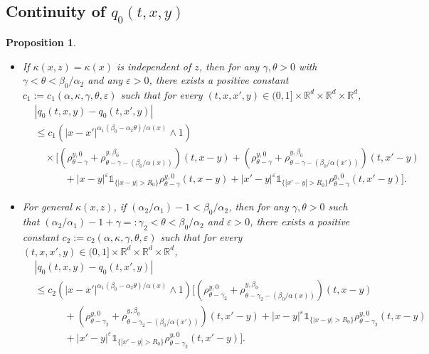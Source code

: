 \documentclass[a4paper,11pt]{amsart}
\renewcommand{\le}{\leqslant}
\newcommand{\R}{\mathds R}
\newcommand{\B}{\beta}
\newcommand{\I}{\mathds 1}
\newcommand{\K}{\kappa}
\newcommand{\A}{\alpha}
\newcommand{\G}{\gamma}
\newtheorem{proposition}[theorem]{Proposition}
\theoremstyle{definition}
\begin{document}
\subsection{Continuity of $q_0(t,x,y)$}
\begin{proposition}\label{p3-1-1a-p}
 \begin{itemize}
 \item[(1)] If $\kappa(x,z)=\K (x) $ is independent of $z$, then for any $\gamma,\theta>0$ with $\gamma<\theta<{\beta_0}/{\A_2}$ and any
$\varepsilon>0$,
there exists a positive constant $c_1:=c_1(\A,\K, \G, \theta,\varepsilon)$ such that
for every $(t,x,x',y)\in (0,1]\times \R^d\times \R^d \times \R^d$,
\begin{equation}\label{p3-1-1a-1}
\begin{split}
&|q_0(t,x,y)-q_0(t,x',y)|\\
&\le c_1\left(|x-x'|^{\A_1(\B_0-\A_2\theta)/{\A(x)}}\wedge 1\right)\\
&\quad \times\Big[\left(\rho^{y,0}_{\theta-\gamma}+\rho^{y,\B_0}_{\theta-\gamma-({\B_0}/{\A(x)})}\right)(t,x-y)
+\left(\rho^{y,0}_{\theta-\gamma}+\rho^{y,\B_0}_{\theta-\gamma-({\B_0}/{\A(x')})}\right)(t,x'-y)\\
&\qquad\quad  +|x-y|^{\varepsilon}\I_{\{|x-y|>R_0\}}\rho^{y,0}_{\theta-\gamma}(t,x-y) +|x'-y|^{\varepsilon}\I_{\{|x'-y|>R_0\}}\rho^{y,0}_{\theta-\gamma}(t,x'-y)\Big].
\end{split}
\end{equation}

\item[(2)]
For general $\K (x, z)$, if $({\A_2}/{\A_1})-1<{\B_0}/{\A_2}$,
then for any $\gamma,\theta>0$ such that $ ({\A_2}/{\A_1})-1+\gamma =:\G_2 <\theta<{\B_0}/{\A_2}$ and
$\varepsilon>0$, there exists a positive constant $c_2:=c_2(\A,\K,\G,\theta,\varepsilon)$ such that for every $(t,x,x',y)\in (0,1]\times \R^d\times \R^d \times \R^d$,
\begin{equation}\label{p3-1-2a-1}
\begin{split}
& |q_0(t,x,y)-q_0(t,x',y)|\\
&\le c_2\left(|x-x'|^{\A_1(\B_0-\A_2\theta)/{\A(x)}}\wedge 1\right)
\Big[\left(\rho^{y,0}_{\theta-\G_2 }+\rho^{y,\B_0}_{\theta-\G_2-({\B_0}/{\A(x)})}\right)(t,x-y)\\
&\qquad\quad +\left(\rho^{y,0}_{\theta-\G_2}+\rho^{y,\B_0}_{\theta-\G_2 -({\B_0}/{\A(x')})}\right)(t,x'-y)
 +|x-y|^{\varepsilon}\I_{\{|x-y|>R_0\}}\rho^{y,0}_{\theta-\G_2 }(t,x-y)\\
 & \qquad \quad
+|x'-y|^{\varepsilon}\I_{\{|x'-y|>R_0\}}\rho^{y,0}_{\theta-\G_2 }(t,x'-y)\Big].
\end{split}
\end{equation}
\end{itemize}



\end{proposition}
\end{document}
